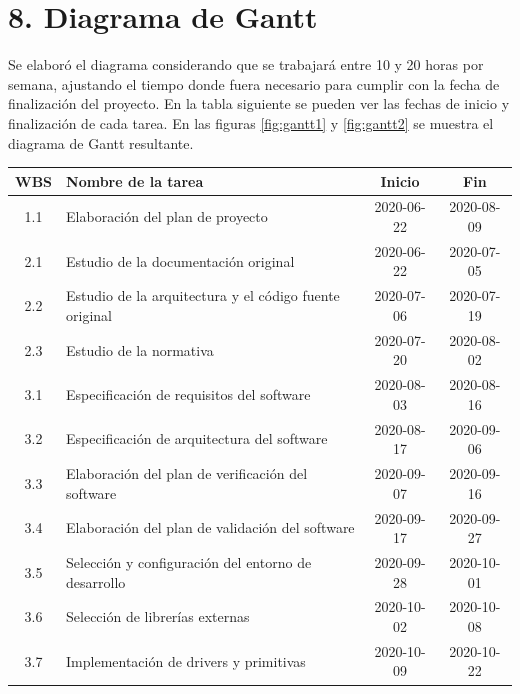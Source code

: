 \documentclass[11pt]{charter}
\begin{document}
\newpage

\section{8. Diagrama de Gantt}
\label{sec:gantt}

Se elaboró el diagrama considerando que se trabajará entre 10 y 20 horas por semana, ajustando el tiempo
donde fuera necesario para cumplir con la fecha de finalización del proyecto. En la tabla siguiente se pueden ver las fechas de
inicio y finalización de cada tarea. En las figuras \ref{fig:gantt1} y \ref{fig:gantt2} se muestra el diagrama de Gantt resultante.

\begin{table}[htpb]
  \centering
  \begin{tabularx}{\linewidth}{@{}|c|X|c|c|@{}}
  \hline
  \rowcolor[HTML]{C0C0C0} 
  WBS  & Nombre de la tarea                                       & Inicio     & Fin        \\ \hline
  1.1  & Elaboración del plan de proyecto                         & 2020-06-22 & 2020-08-09 \\ \hline
  2.1  & Estudio de la documentación original                     & 2020-06-22 & 2020-07-05 \\ \hline
  2.2  & Estudio de la arquitectura y el código fuente original   & 2020-07-06 & 2020-07-19 \\ \hline
  2.3  & Estudio de la normativa                                  & 2020-07-20 & 2020-08-02 \\ \hline
  3.1  & Especificación de requisitos del software                & 2020-08-03 & 2020-08-16 \\ \hline
  3.2  & Especificación de arquitectura del software              & 2020-08-17 & 2020-09-06 \\ \hline
  3.3  & Elaboración del plan de verificación del software        & 2020-09-07 & 2020-09-16 \\ \hline
  3.4  & Elaboración del plan de validación del software          & 2020-09-17 & 2020-09-27 \\ \hline
  3.5  & Selección y configuración del entorno de desarrollo      & 2020-09-28 & 2020-10-01 \\ \hline
  3.6  & Selección de librerías externas                          & 2020-10-02 & 2020-10-08 \\ \hline
  3.7  & Implementación de drivers y primitivas                   & 2020-10-09 & 2020-10-22 \\ \hline

\end{tabularx}
\end{table}
\end{document}
